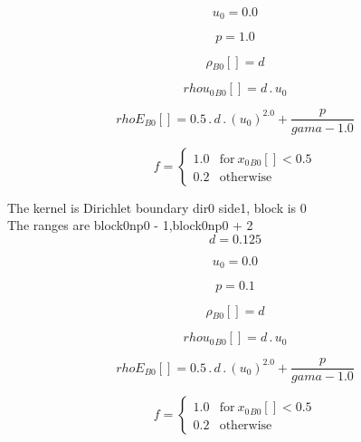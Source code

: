 \documentclass{article}
\begin{document}
\begin{dmath}u_{0} = 0.0\end{dmath}

\begin{dmath}p = 1.0\end{dmath}

\begin{dmath}{\rho{_{B0}}}[{}] = d\end{dmath}

\begin{dmath}{rhou_{0}{_{B0}}}[{}] = d \,.\, u_{0}\end{dmath}

\begin{dmath}{rhoE{_{B0}}}[{}] = 0.5 \,.\, d \,.\, \left(u_{0} \right)^{2.0} + \frac{p}{gama - 1.0}\end{dmath}

\begin{dmath}f = \begin{cases} 1.0 & \text{for}\: {x_{0}{_{B0}}}[{}] < 0.5 \\0.2 & \text{otherwise} \end{cases}\end{dmath}

\noindent The kernel is Dirichlet boundary dir0 side1, block is 0\\\noindent The ranges are block0np0 - 1,block0np0 + 2\\\begin{dmath}d = 0.125\end{dmath}

\begin{dmath}u_{0} = 0.0\end{dmath}

\begin{dmath}p = 0.1\end{dmath}

\begin{dmath}{\rho{_{B0}}}[{}] = d\end{dmath}

\begin{dmath}{rhou_{0}{_{B0}}}[{}] = d \,.\, u_{0}\end{dmath}

\begin{dmath}{rhoE{_{B0}}}[{}] = 0.5 \,.\, d \,.\, \left(u_{0} \right)^{2.0} + \frac{p}{gama - 1.0}\end{dmath}

\begin{dmath}f = \begin{cases} 1.0 & \text{for}\: {x_{0}{_{B0}}}[{}] < 0.5 \\0.2 & \text{otherwise} \end{cases}\end{dmath}
\end{document}

